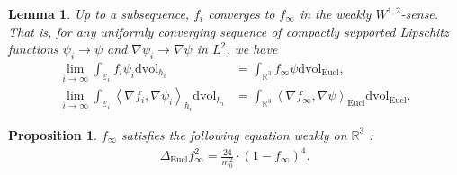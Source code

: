 \documentclass[10pt,a4paper]{amsart}
\newtheorem{lem}{Lemma}
\newtheorem{prop}{Proposition}
\begin{document}
\begin{lem}\label{weak-W12}
	Up to a subsequence, $f_i$ converges to $f_\infty$ in the weakly $W^{1,2}$-sense. That is, for any uniformly converging sequence of compactly supported Lipschitz functions $\psi _i \to \psi $ and $\nabla \psi _i \to \nabla \psi $ in $L^2$, we have 
	\begin{align*}
		\lim_{i\to \infty} \int_{\mathcal{E}_i} f _i \psi _i \mathrm{dvol}_{h_i} & = \int_{\mathbb{R}^3} f _\infty \psi \mathrm{dvol}_{\mathrm{Eucl}},\\
		\lim_{i\to \infty} \int_{\mathcal{E}_i} \left<\nabla f _i, \nabla \psi _i \right>_{h_i} \mathrm{dvol}_{h_i} &= \int_{\mathbb{R}^3} \left<\nabla f _\infty, \nabla \psi  \right>_{\mathrm{Eucl} } \mathrm{dvol}_{\mathrm{Eucl}}.
	\end{align*}
\end{lem}

\begin{prop}
	$f _\infty$ satisfies the following equation weakly on $\mathbb{R}^3$ :
	\begin{align}\label{f2-eq}
\Delta _{\mathrm{Eucl} } f_\infty ^2 = \frac{24}{m_0^2} \cdot (1-f_\infty)^4.
\end{align}
\end{prop}
\end{document}

